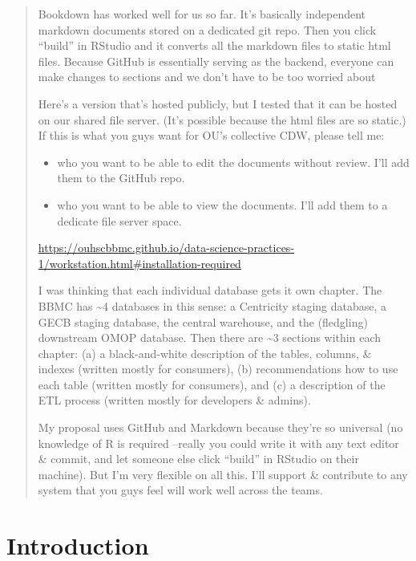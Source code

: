 \documentclass[]{book}
\providecommand{\tightlist}{%
  \setlength{\itemsep}{0pt}\setlength{\parskip}{0pt}}
\begin{document}
\begin{quote}
Bookdown has worked well for us so far. It's basically independent markdown documents stored on a dedicated git repo. Then you click ``build'' in RStudio and it converts all the markdown files to static html files. Because GitHub is essentially serving as the backend, everyone can make changes to sections and we don't have to be too worried about

Here's a version that's hosted publicly, but I tested that it can be hosted on our shared file server. (It's possible because the html files are so static.) If this is what you guys want for OU's collective CDW, please tell me:

\begin{itemize}
\tightlist
\item
  who you want to be able to edit the documents without review. I'll add them to the GitHub repo.
\item
  who you want to be able to view the documents. I'll add them to a dedicate file server space.
\end{itemize}

\url{https://ouhscbbmc.github.io/data-science-practices-1/workstation.html\#installation-required}

I was thinking that each individual database gets it own chapter. The BBMC has \textasciitilde{}4 databases in this sense: a Centricity staging database, a GECB staging database, the central warehouse, and the (fledgling) downstream OMOP database. Then there are \textasciitilde{}3 sections within each chapter: (a) a black-and-white description of the tables, columns, \& indexes (written mostly for consumers), (b) recommendations how to use each table (written mostly for consumers), and (c) a description of the ETL process (written mostly for developers \& admins).

My proposal uses GitHub and Markdown because they're so universal (no knowledge of R is required --really you could write it with any text editor \& commit, and let someone else click ``build'' in RStudio on their machine). But I'm very flexible on all this. I'll support \& contribute to any system that you guys feel will work well across the teams.
\end{quote}

\hypertarget{intro}{%
\chapter{Introduction}\label{intro}}
\end{document}
